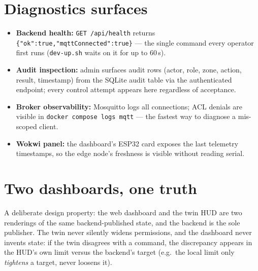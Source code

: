 \section{Diagnostics surfaces}

\begin{itemize}
  \item \textbf{Backend health:} \texttt{GET /api/health} returns
        \texttt{\{"ok":true,"mqttConnected":true\}} --- the single command
        every operator first runs (\texttt{dev-up.sh} waits on it for
        up to 60\,s).
  \item \textbf{Audit inspection:} admin surfaces audit rows (actor, role,
        zone, action, result, timestamp) from the SQLite audit table via
        the authenticated endpoint; every control attempt appears here
        regardless of acceptance.
  \item \textbf{Broker observability:} Mosquitto logs all connections;
        ACL denials are visible in \texttt{docker compose logs mqtt} ---
        the fastest way to diagnose a mis-scoped client.
  \item \textbf{Wokwi panel:} the dashboard's ESP32 card exposes the last
        telemetry timestamps, so the edge node's freshness is visible
        without reading serial.
\end{itemize}

\section{Two dashboards, one truth}

A deliberate design property: the web dashboard and the twin HUD are two
renderings of the same backend-published state, and the backend is the
sole publisher. The twin never silently widens permissions, and the
dashboard never invents state: if the twin disagrees with a command, the
discrepancy appears in the HUD's own limit versus the backend's target
(e.g.\ the local limit only \emph{tightens} a target, never loosens it).

